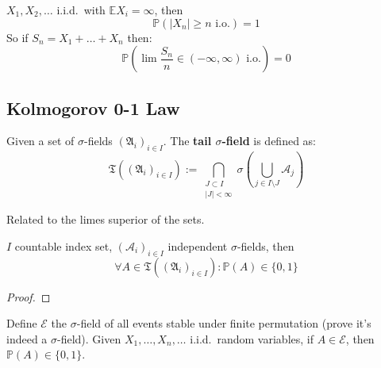 \begin{theorem}
	$X_1, X_2, \dots$ i.i.d.\ with $\mathbb{E} X_i = \infty$, then
	\begin{equation*}
		\mathbb{P}(|X_n| \geq n \text{ i.o.}) = 1
	\end{equation*}
	So if $S_n = X_1 + \dots + X_n$ then:
	\begin{equation*}
		\mathbb{P}\!\left(\lim \frac{S_n}{n} \in (-\infty, \infty) \text{ i.o.}\right) = 0
	\end{equation*}
\end{theorem}


\subsection{Kolmogorov 0-1 Law}
\begin{definition}
Given a set of $\sigma$-fields $(\mathfrak{A}_i)_{i \in I}$. The \textbf{tail $\sigma$-field} is defined as:
	\begin{equation*}
		\mathfrak{T}\!\left((\mathfrak{A}_i)_{i \in I}\right) := \bigcap_{\substack{J \subset I \\ |J| < \infty}} \sigma\!\left(\bigcup_{j \in I \setminus J} \mathcal{A}_j\right)
	\end{equation*}
\end{definition}
\begin{remark}
Related to the limes superior of the sets.
\end{remark}


\begin{theorem}
	$I$ countable index set, $(\mathcal{A}_i)_{i \in I}$ independent $\sigma$-fields, then
	\begin{equation*}
		\forall A \in \mathfrak{T}\!\left((\mathfrak{A}_i)_{i \in I}\right): \mathbb{P}(A) \in \{0, 1\}
	\end{equation*}
\end{theorem}
\begin{proof}

\end{proof}

\begin{theorem}
	Define $\mathcal{E}$ the $\sigma$-field of all events stable under finite permutation (prove it's indeed a $\sigma$-field). Given $X_1, \dots, X_n, \dots$ i.i.d.\ random variables, if $A \in \mathcal{E}$, then $\mathbb{P}(A) \in \{0, 1\}$.
\end{theorem}


